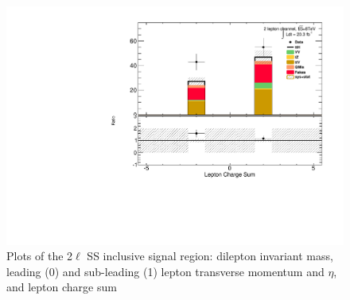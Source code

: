 \begin{figure}[!htbp]
\begin{minipage}[h]{0.5\textwidth}
    \centering \includegraphics[width=\textwidth]{figs/results/plotCand_2lep_LeptonChargeSum}
  \end{minipage}\hfill
\caption{Plots of the 2$\ell$ SS inclusive signal region: dilepton invariant mass, leading (0) and sub-leading (1) lepton transverse momentum and $\eta$, and lepton charge sum} 
\label{figure:results_2l_lep}
\end{figure} 


